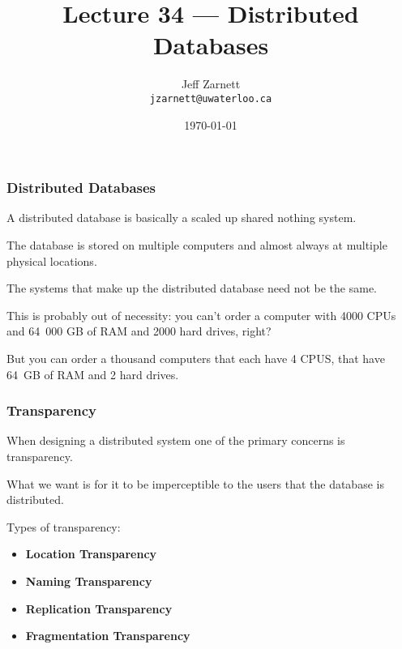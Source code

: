 

\title{Lecture  34 --- Distributed Databases}

\author{Jeff Zarnett \\ \small \texttt{jzarnett@uwaterloo.ca}}
\date{\today}




\begin{frame}
  \titlepage

 \end{frame}



\begin{frame}
\frametitle{Distributed Databases}

A distributed database is basically a scaled up shared nothing system. 

The database is stored on multiple computers and almost always at multiple physical locations.

 The systems that make up the distributed database need not be the same. 
 
This is probably out of necessity: you can't order a computer with 4000 CPUs and 64~000 GB of RAM and 2000 hard drives, right? 
 
But you can order a thousand computers that each have 4 CPUS, that have 64~GB of RAM and 2 hard drives.

\end{frame}


\begin{frame}
\frametitle{Transparency}

When designing a distributed system one of the primary concerns is \alert{transparency}. 

What we want is for it to be imperceptible to the users that the database is distributed.

Types of transparency: 
\begin{itemize}
	\item \textbf{Location Transparency}
	\item \textbf{Naming Transparency}
	\item \textbf{Replication Transparency}
	\item \textbf{Fragmentation Transparency}
\end{itemize}



\end{frame}

